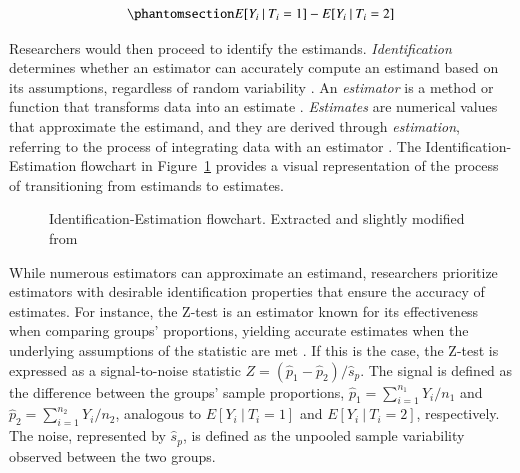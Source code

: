 \documentclass[
  authoryear,
  review,
  1p]{elsarticle}
\begin{document}
\begin{equation}\phantomsection\label{eq-group_diff}{
E[Y_{i} \:|\:T_{i}=1] - E[Y_{i} \:|\:T_{i}=2]
}\end{equation}

Researchers would then proceed to identify the estimands.
\emph{Identification} determines whether an estimator can accurately
compute an estimand based on its assumptions, regardless of random
variability \citep[pp.~4]{Schuessler_et_al_2023}. An \emph{estimator} is
a method or function that transforms data into an estimate
\citep{Neal_2020}. \emph{Estimates} are numerical values that
approximate the estimand, and they are derived through
\emph{estimation}, referring to the process of integrating data with an
estimator \citep{Everitt_et_al_2010}. The Identification-Estimation
flowchart \citep{McElreath_2020, Neal_2020} in Figure~\ref{fig-IEflow}
provides a visual representation of the process of transitioning from
estimands to estimates.

\begin{figure}


\caption{\label{fig-IEflow}Identification-Estimation flowchart.
Extracted and slightly modified from \citet[pp.~32]{Neal_2020}}

\end{figure}%

While numerous estimators can approximate an estimand, researchers
prioritize estimators with desirable identification properties that
ensure the accuracy of estimates. For instance, the Z-test is an
estimator known for its effectiveness when comparing groups'
proportions, yielding accurate estimates when the underlying assumptions
of the statistic are met \citep{Kanji_2006}. If this is the case, the
Z-test is expressed as a signal-to-noise statistic
\(Z = (\hat{p}_{1} - \hat{p}_{2})/ \hat{s}_{p}\). The signal is defined
as the difference between the groups' sample proportions,
\(\hat{p}_{1} = \sum_{i=1}^{n_{1}}{Y_{i}/n_{1}}\) and
\(\hat{p}_{2} = \sum_{i=1}^{n_{2}}{Y_{i}/n_{2}}\), analogous to
\(E[Y_{i} \:|\:T_{i}=1]\) and \(E[Y_{i} \:|\:T_{i}=2]\), respectively.
The noise, represented by \(\hat{s}_{p}\), is defined as the unpooled
sample variability observed between the two groups.
\end{document}
